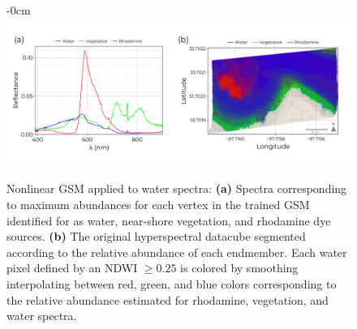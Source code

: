\documentclass[remotesensing,article,submit,pdftex,moreauthors]{Definitions/mdpi}
\begin{document}
\begin{figure}[H]
\begin{adjustwidth}{-\extralength}{0cm}
\centering
\includegraphics[width=1.25\columnwidth]{results/robot-team/extracted-endmembers.pdf}
\end{adjustwidth}
\caption{Nonlinear GSM applied to water spectra: \textbf{(a)} Spectra corresponding to maximum abundances for each vertex in the trained GSM identified for as water, near-shore vegetation, and rhodamine dye sources. \textbf{(b)} The original hyperspectral datacube segmented according to the relative abundance of each endmember. Each water pixel defined by an NDWI $\geq 0.25$ is colored by smoothing interpolating between red, green, and blue colors corresponding to the relative abundance estimated for rhodamine, vegetation, and water spectra.}
\label{fig:robot-team-endmembers}
\end{figure}  
\end{document}
